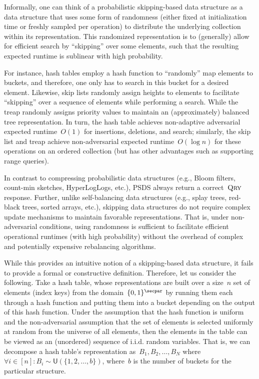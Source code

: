 Informally, one can think of a probabilistic skipping-based data structure as a data structure that uses some form of randomness (either fixed at initialization time or freshly sampled per operation) to distribute the underlying collection within its representation. This randomized representation is to (generally) allow for efficient search by ``skipping'' over some elements, such that the resulting expected runtime is sublinear with high probability. 

For instance, hash tables employ a hash function to ``randomly'' map elements to buckets, and therefore, one only has to search in this bucket for a desired element. Likewise, skip lists randomly assign heights to elements to facilitate ``skipping'' over a sequence of elements while performing a search. While the treap randomly assigns priority values to maintain an (approximately) balanced tree representation.  In turn, the hash table achieves non-adaptive adversarial expected runtime~$O(1)$ for insertions, deletions, and search; similarly, the skip list and treap achieve non-adversarial expected runtime~$O(\log n)$ for these operations on an ordered collection (but has other advantages such as supporting range queries). 

In contrast to compressing probabilistic data structures (e.g., Bloom filters, count-min sketches, HyperLogLogs, etc.), PSDS always return a correct~$\textnormal{\textsc{Qry}}$ response. Further, unlike self-balancing data structures (e.g., splay trees, red-black trees, sorted arrays, etc.), skipping data structures do not require complex update mechanisms to maintain favorable representations. That is, under non-adversarial conditions, using randomness is sufficient to facilitate efficient operational runtimes (with high probability) without the overhead of complex and potentially expensive rebalancing algorithms. 

While this provides an intuitive notion of a skipping-based data structure, it fails to provide a formal or constructive definition. Therefore, let us consider the following. Take a hash table, whose representations are built over a size~$n$ set of elements (index keys) from the domain~$\{0,1\}^\secpar$ by running them each through a hash function and putting them into a bucket depending on the output of this hash function. Under the assumption that the hash function is uniform and the non-adversarial assumption that the set of elements is selected uniformly at random from the universe of all elements, then the elements in the table can be viewed as an (unordered) sequence of i.i.d. random variables. That is, we can decompose a hash table's representation as~$B_1,B_2,\ldots,B_N$ where~$\forall i \in [n]: B_{i} \sim \mathsf{U}(\{1,2,\ldots,b\})$, where~$b$ is the number of buckets for the particular structure.

